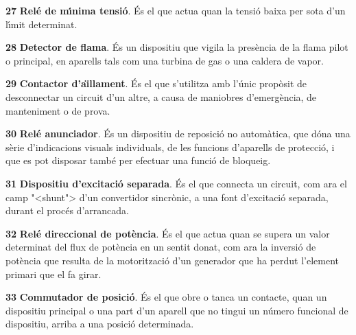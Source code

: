 \begin{multicols}{2}
\begin{list}{}
\item[\textbf{27}]   
\textbf{Rel\'{e} de m\'{\i}nima tensi\'{o}}. \'{E}s el que
actua quan la tensi\'{o} baixa per sota d'un l\'{\i}mit determinat.

\item[\textbf{28}]   
\textbf{Detector de flama}. \'{E}s un dispositiu que vigila la pres\`{e}ncia de la flama pilot o principal, en aparells tals com una turbina de gas o una caldera  de vapor.

\item[\textbf{29}]  
\textbf{Contactor d'a\"{\i}llament}. \'{E}s el que
s'utilitza amb l'\'{u}nic prop\`{o}sit de desconnectar un circuit d'un
altre,  a  causa de maniobres    d'emerg\`{e}ncia,  de manteniment o de
prova.

\item[\textbf{30}]  
 \textbf{Rel\'{e} anunciador}. \'{E}s un dispositiu de
reposici\'{o} no autom\`{a}tica, que d\'{o}na una s\`{e}rie d'indicacions visuals
individuals, de les funcions d'aparells de protecci\'{o}, i que es pot
disposar tamb\'{e} per efectuar una funci\'{o} de bloqueig.

\item[\textbf{31}]  
\textbf{Dispositiu d'excitaci\'{o}
separada}. \'{E}s el que connecta un circuit, com ara el camp {"<}shunt{">}
d'un convertidor sincr\`{o}nic, a una font d'excitaci\'{o} separada, durant el proc\'{e}s
d'arrancada.

\item[\textbf{32}]  
\textbf{Rel\'{e} direccional de pot\`{e}ncia}. \'{E}s el que actua quan se supera un valor determinat del
flux de pot\`{e}ncia en un sentit donat, com ara la inversi\'{o} de pot\`{e}ncia que resulta de la motoritzaci\'{o} d'un generador que ha perdut l'element primari que el fa girar.

\item[\textbf{33}]  
\textbf{Commutador de posici\'{o}}. \'{E}s el que
obre o tanca un contacte, quan un dispositiu principal o una part d'un aparell que no tingui un n\'{u}mero funcional de dispositiu, arriba a una posici\'{o} determinada.


\end{list}
\end{multicols}
